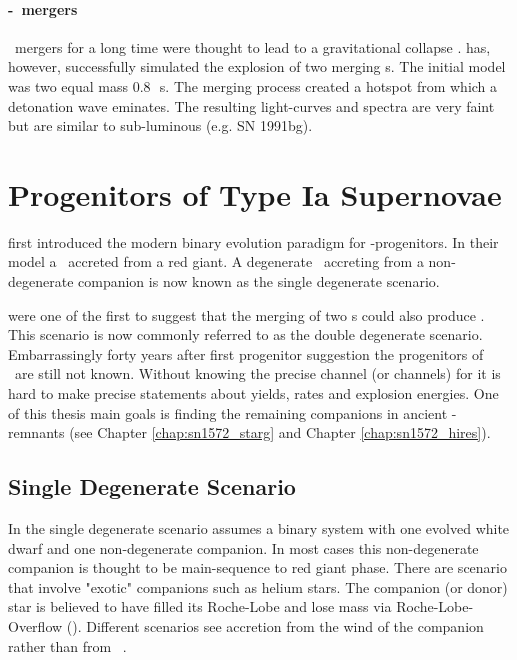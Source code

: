 \paragraph{\WD-\WD\ mergers}
\cowd\ mergers for a long time were thought to lead to a gravitational collapse \citep[same mechanism as the \onemgwd][]{1985A&A...150L..21S}. \citet{2010Natur.463...61P} has, however, successfully simulated the explosion of two merging \cowd s. The initial model was two equal mass 0.8\,\msun\ \cowd s. The merging process created a hotspot from which a detonation wave eminates. 
The resulting light-curves and spectra are very faint but are similar to sub-luminous \snia (e.g. SN 1991bg). 


\section{Progenitors of Type Ia Supernovae}
\label{sec:snia_progenitor}

\citet{1973ApJ...186.1007W} first introduced the modern binary evolution paradigm for \snia-progenitors. In their model a \cowd\ accreted from a red giant. A degenerate \cowd\ accreting from a non-degenerate companion is now known as the single degenerate scenario. 

\cite{1985ApJ...297..531N} were one of the first to suggest that the merging of two \cowd s could also produce \sneia. This scenario is now commonly referred to as the double degenerate scenario. 
Embarrassingly forty years after first progenitor suggestion the progenitors of \snia\ are still not known. Without knowing the precise channel (or channels) for \snia it is hard to make precise statements about yields, rates and explosion energies. One of this thesis main goals is finding the remaining companions in ancient \snia-remnants (see Chapter \ref{chap:sn1572_starg} and Chapter \ref{chap:sn1572_hires}). 


\subsection{Single Degenerate Scenario}
In the single degenerate scenario assumes a binary system with one evolved white dwarf and one non-degenerate companion. In most cases this non-degenerate companion is thought to be main-sequence to red giant phase. There are scenario that involve "exotic" companions such as helium stars. The companion (or donor) star is believed to have filled its Roche-Lobe and lose mass via Roche-Lobe-Overflow (\rlof). Different scenarios see accretion from the wind of the companion rather than from \rlof\ \citep{2011apn5.confE.295M}.


